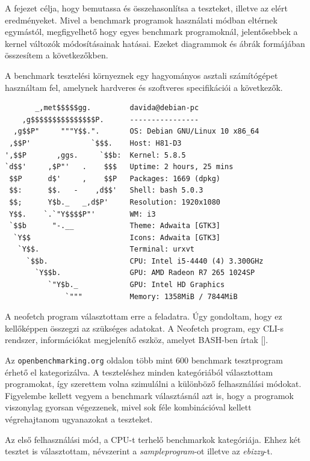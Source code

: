 
A fejezet célja, hogy bemutassa és összehasonlítsa a teszteket, illetve az elért eredményeket. Mivel a benchmark programok használati módban eltérnek egymástól, megfigyelhető hogy egyes benchmark programoknál, jelentősebbek a kernel változók módosításainak hatásai.
Ezeket diagrammok és ábrák formájában összesítem a következőkben.

A benchmark tesztelési környeznek egy hagyományos asztali számítógépet használtam fel, amelynek hardveres és szoftveres specifikációi a következők.

\begin{lstlisting}
       _,met$$$$$gg.         davida@debian-pc 
    ,g$$$$$$$$$$$$$$$P.      ---------------- 
  ,g$$P"     """Y$$.".       OS: Debian GNU/Linux 10 x86_64 
 ,$$P'              `$$$.    Host: H81-D3 
',$$P       ,ggs.     `$$b:  Kernel: 5.8.5 
`d$$'     ,$P"'   .    $$$   Uptime: 2 hours, 25 mins 
 $$P      d$'     ,    $$P   Packages: 1669 (dpkg) 
 $$:      $$.   -    ,d$$'   Shell: bash 5.0.3 
 $$;      Y$b._   _,d$P'     Resolution: 1920x1080 
 Y$$.    `.`"Y$$$$P"'        WM: i3 
 `$$b      "-.__             Theme: Adwaita [GTK3] 
  `Y$$                       Icons: Adwaita [GTK3] 
   `Y$$.                     Terminal: urxvt 
     `$$b.                   CPU: Intel i5-4440 (4) 3.300GHz 
       `Y$$b.                GPU: AMD Radeon R7 265 1024SP 
          `"Y$b._            GPU: Intel HD Graphics 
              `"""           Memory: 1358MiB / 7844MiB
\end{lstlisting}
A neofetch program választottam erre a feladatra. Úgy gondoltam, hogy ez kellőképpen összegzi az szükséges adatokat. A Neofetch program, egy CLI-s rendszer, információkat megjelenítő eszköz, amelyet BASH-ben írtak [].



Az \texttt{openbenchmarking.org} oldalon több mint 600 benchmark tesztprogram érhető el kategorizálva. A teszteléshez minden kategóriából választottam programokat, így szerettem volna szimulálni a különböző felhasználási módokat. Figyelembe kellett vegyem a benchmark választásnál azt is, hogy a programok viszonylag gyorsan végezzenek, mivel sok féle kombinációval kellett végrehajtanom ugyanazokat a teszteket. 


Az első felhasználási mód, a CPU-t terhelő benchmarkok kategóriája. Ehhez két tesztet is választottam, névszerint a \textit{sampleprogram}-ot illetve az \textit{ebizzy}-t.

